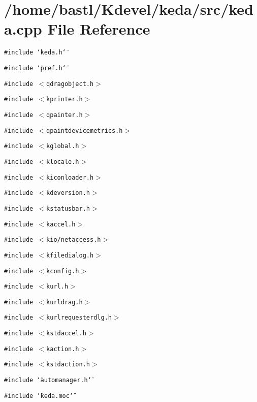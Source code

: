 \section{/home/bastl/Kdevel/keda/src/keda.cpp File Reference}
\label{keda_8cpp}
{\tt \#include \char`\"{}keda.h\char`\"{}}\par
{\tt \#include \char`\"{}pref.h\char`\"{}}\par
{\tt \#include $<$qdragobject.h$>$}\par
{\tt \#include $<$kprinter.h$>$}\par
{\tt \#include $<$qpainter.h$>$}\par
{\tt \#include $<$qpaintdevicemetrics.h$>$}\par
{\tt \#include $<$kglobal.h$>$}\par
{\tt \#include $<$klocale.h$>$}\par
{\tt \#include $<$kiconloader.h$>$}\par
{\tt \#include $<$kdeversion.h$>$}\par
{\tt \#include $<$kstatusbar.h$>$}\par
{\tt \#include $<$kaccel.h$>$}\par
{\tt \#include $<$kio/netaccess.h$>$}\par
{\tt \#include $<$kfiledialog.h$>$}\par
{\tt \#include $<$kconfig.h$>$}\par
{\tt \#include $<$kurl.h$>$}\par
{\tt \#include $<$kurldrag.h$>$}\par
{\tt \#include $<$kurlrequesterdlg.h$>$}\par
{\tt \#include $<$kstdaccel.h$>$}\par
{\tt \#include $<$kaction.h$>$}\par
{\tt \#include $<$kstdaction.h$>$}\par
{\tt \#include \char`\"{}automanager.h\char`\"{}}\par
{\tt \#include \char`\"{}keda.moc\char`\"{}}\par
